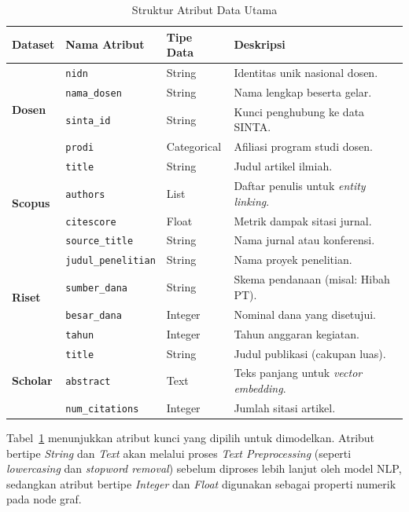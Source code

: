 \begin{table}[htbp]
    \centering
    \caption{Struktur Atribut Data Utama}
    \label{tab:struktur-data}
    \renewcommand{\arraystretch}{1.3}
    \begin{tabular}{|l|l|l|p{5.5cm}|}
        \hline
        \textbf{Dataset} & \textbf{Nama Atribut} & \textbf{Tipe Data} & \textbf{Deskripsi} \\ 
        \hline
        \multirow{4}{*}{\textbf{Dosen}} 
        & \texttt{nidn} & String & Identitas unik nasional dosen. \\ 
        & \texttt{nama\_dosen} & String & Nama lengkap beserta gelar. \\ 
        & \texttt{sinta\_id} & String & Kunci penghubung ke data SINTA. \\ 
        & \texttt{prodi} & Categorical & Afiliasi program studi dosen. \\ 
        \hline
        \multirow{4}{*}{\textbf{Scopus}} 
        & \texttt{title} & String & Judul artikel ilmiah. \\ 
        & \texttt{authors} & List & Daftar penulis untuk \textit{entity linking}. \\ 
        & \texttt{citescore} & Float & Metrik dampak sitasi jurnal. \\ 
        & \texttt{source\_title} & String & Nama jurnal atau konferensi. \\ 
        \hline
        \multirow{4}{*}{\textbf{Riset}} 
        & \texttt{judul\_penelitian} & String & Nama proyek penelitian. \\ 
        & \texttt{sumber\_dana} & String & Skema pendanaan (misal: Hibah PT). \\ 
        & \texttt{besar\_dana} & Integer & Nominal dana yang disetujui. \\ 
        & \texttt{tahun} & Integer & Tahun anggaran kegiatan. \\ 
        \hline
        \multirow{3}{*}{\textbf{Scholar}} 
        & \texttt{title} & String & Judul publikasi (cakupan luas). \\ 
        & \texttt{abstract} & Text & Teks panjang untuk \textit{vector embedding}. \\ 
        & \texttt{num\_citations} & Integer & Jumlah sitasi artikel. \\ 
        \hline
    \end{tabular}
\end{table}

Tabel~\ref{tab:struktur-data} menunjukkan atribut kunci yang dipilih untuk dimodelkan. Atribut bertipe \textit{String} dan \textit{Text} akan melalui proses \textit{Text Preprocessing} (seperti \textit{lowercasing} dan \textit{stopword removal}) sebelum diproses lebih lanjut oleh model NLP, sedangkan atribut bertipe \textit{Integer} dan \textit{Float} digunakan sebagai properti numerik pada node graf.

